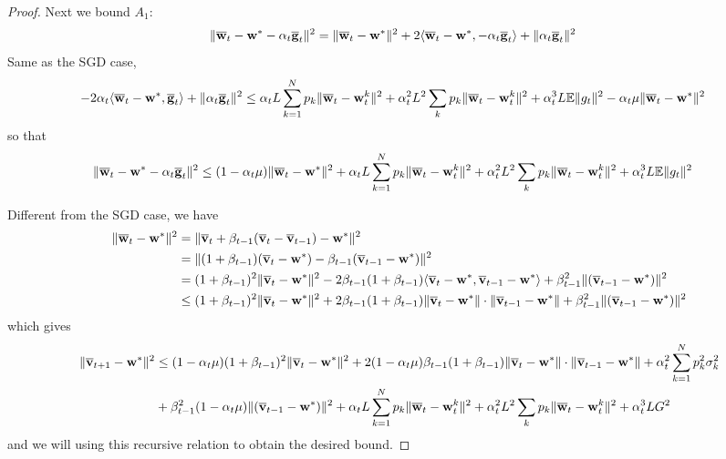 \begin{proof}
Next we bound $A_{1}$: 
\begin{align*}
\|{\overline{\mathbf{w}}}_{t}-{\mathbf{w}}^{\ast}-\alpha_{t}{\overline{\mathbf{g}}}_{t}\|^{2} & =\|{\overline{\mathbf{w}}}_{t}-{\mathbf{w}}^{\ast}\|^{2}+2\langle{\overline{\mathbf{w}}}_{t}-{\mathbf{w}}^{\ast},-\alpha_{t}{\overline{\mathbf{g}}}_{t}\rangle+\|\alpha_{t}{\overline{\mathbf{g}}}_{t}\|^{2}
\end{align*}
Same as the SGD case, 
\begin{align*}
-2\alpha_{t}\langle{\overline{\mathbf{w}}}_{t}-{\mathbf{w}}^{\ast},{\overline{\mathbf{g}}}_{t}\rangle+\|\alpha_{t}{\overline{\mathbf{g}}}_{t}\|^{2} & \leq\alpha_{t}L\sum_{k=1}^{N}p_{k}\|{\overline{\mathbf{w}}}_{t}-{\mathbf{w}}_{t}^{k}\|^{2}+\alpha_{t}^{2}L^{2}\sum_{k}p_{k}\|{\overline{\mathbf{w}}}_{t}-{\mathbf{w}}_{t}^{k}\|^{2}+\alpha_{t}^{3}L\mathbb{E}\|g_{t}\|^{2}-\alpha_{t}\mu\|{\overline{\mathbf{w}}}_{t}-{\mathbf{w}}^{\ast}\|^{2}
\end{align*}
so that 
\begin{align*}
\|{\overline{\mathbf{w}}}_{t}-{\mathbf{w}}^{\ast}-\alpha_{t}{\overline{\mathbf{g}}}_{t}\|^{2} & \leq(1-\alpha_{t}\mu)\|{\overline{\mathbf{w}}}_{t}-{\mathbf{w}}^{\ast}\|^{2}+\alpha_{t}L\sum_{k=1}^{N}p_{k}\|{\overline{\mathbf{w}}}_{t}-{\mathbf{w}}_{t}^{k}\|^{2}+\alpha_{t}^{2}L^{2}\sum_{k}p_{k}\|{\overline{\mathbf{w}}}_{t}-{\mathbf{w}}_{t}^{k}\|^{2}+\alpha_{t}^{3}L\mathbb{E}\|g_{t}\|^{2}
\end{align*}

Different from the SGD case, we have 
\begin{align*}
\|{\overline{\mathbf{w}}}_{t}-{\mathbf{w}}^{\ast}\|^{2} & =\|{\overline{\mathbf{v}}}_{t}+\beta_{t-1}({\overline{\mathbf{v}}}_{t}-{\overline{\mathbf{v}}}_{t-1})-{\mathbf{w}}^{\ast}\|^{2}\\
& =\|(1+\beta_{t-1})({\overline{\mathbf{v}}}_{t}-{\mathbf{w}}^{\ast})-\beta_{t-1}({\overline{\mathbf{v}}}_{t-1}-{\mathbf{w}}^{\ast})\|^{2}\\
& =(1+\beta_{t-1})^{2}\|{\overline{\mathbf{v}}}_{t}-{\mathbf{w}}^{\ast}\|^{2}-2\beta_{t-1}(1+\beta_{t-1})\langle{\overline{\mathbf{v}}}_{t}-{\mathbf{w}}^{\ast},{\overline{\mathbf{v}}}_{t-1}-{\mathbf{w}}^{\ast}\rangle+\beta_{t-1}^{2}\|({\overline{\mathbf{v}}}_{t-1}-{\mathbf{w}}^{\ast})\|^{2}\\
& \leq(1+\beta_{t-1})^{2}\|{\overline{\mathbf{v}}}_{t}-{\mathbf{w}}^{\ast}\|^{2}+2\beta_{t-1}(1+\beta_{t-1})\|{\overline{\mathbf{v}}}_{t}-{\mathbf{w}}^{\ast}\|\cdot\|{\overline{\mathbf{v}}}_{t-1}-{\mathbf{w}}^{\ast}\|+\beta_{t-1}^{2}\|({\overline{\mathbf{v}}}_{t-1}-{\mathbf{w}}^{\ast})\|^{2}
\end{align*}
which gives 
\begin{align*}
\|{\overline{\mathbf{v}}}_{t+1}-{\mathbf{w}}^{\ast}\|^{2} & \leq(1-\alpha_{t}\mu)(1+\beta_{t-1})^{2}\|{\overline{\mathbf{v}}}_{t}-{\mathbf{w}}^{\ast}\|^{2}+2(1-\alpha_{t}\mu)\beta_{t-1}(1+\beta_{t-1})\|{\overline{\mathbf{v}}}_{t}-{\mathbf{w}}^{\ast}\|\cdot\|{\overline{\mathbf{v}}}_{t-1}-{\mathbf{w}}^{\ast}\|+\alpha_{t}^{2}\sum_{k=1}^{N}p_{k}^{2}\sigma_{k}^{2}\\
& +\beta_{t-1}^{2}(1-\alpha_{t}\mu)\|({\overline{\mathbf{v}}}_{t-1}-{\mathbf{w}}^{\ast})\|^{2}+\alpha_{t}L\sum_{k=1}^{N}p_{k}\|{\overline{\mathbf{w}}}_{t}-{\mathbf{w}}_{t}^{k}\|^{2}+\alpha_{t}^{2}L^{2}\sum_{k}p_{k}\|{\overline{\mathbf{w}}}_{t}-{\mathbf{w}}_{t}^{k}\|^{2}+\alpha_{t}^{3}LG^{2}
\end{align*}
and we will using this recursive relation to obtain the desired bound. 


\end{proof}
